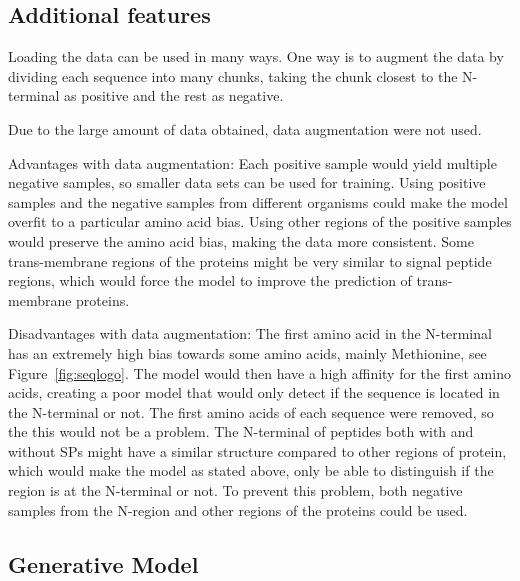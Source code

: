 \subsection{Additional features}

Loading the data can be used in many ways. One way is to augment the data by dividing each sequence into many chunks, taking the chunk closest to the N-terminal as positive and the rest as negative.

Due to the large amount of data obtained, data augmentation were not used.

Advantages with data augmentation: 
Each positive sample would yield multiple negative samples, so smaller data sets can be used for training.
Using positive samples and the negative samples from different organisms could make the model overfit to a particular amino acid bias. Using other regions of the positive samples would preserve the amino acid bias, making the data more consistent.
Some trans-membrane regions of the proteins might be very similar to signal peptide regions, which would force the model to improve the prediction of trans-membrane proteins. 

Disadvantages with data augmentation:
The first amino acid in the N-terminal has an extremely high bias towards some amino acids, mainly Methionine, see Figure~\ref{fig:seqlogo}. The model would then have a high affinity for the first amino acids, creating a poor model that would only detect if the sequence is located in the N-terminal or not. The first amino acids of each sequence were removed, so the this would not be a problem.
The N-terminal of peptides both with and without SPs might have a similar structure compared to other regions of protein, which would make the model as stated above, only be able to distinguish if the region is at the N-terminal or not. To prevent this problem, both negative samples from the N-region and other regions of the proteins could be used.


\subsection{Generative Model} \label{GAN}







